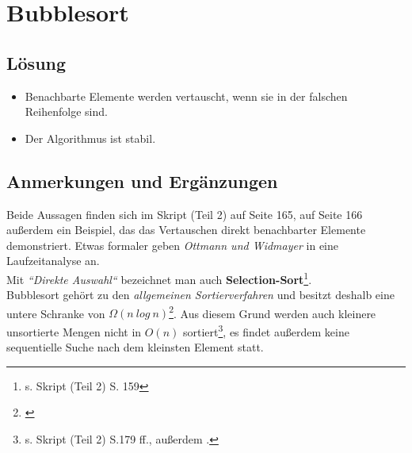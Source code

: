 \chapter{Bubblesort}

\section*{Lösung}

\begin{itemize}
    \item Benachbarte Elemente werden vertauscht, wenn sie in der falschen Reihenfolge sind.
    \item Der Algorithmus ist stabil.
\end{itemize}



\section*{Anmerkungen und Ergänzungen}

Beide Aussagen finden sich im Skript (Teil 2) auf Seite 165, auf Seite 166 außerdem ein Beispiel, das das Vertauschen direkt benachbarter Elemente demonstriert.
Etwas formaler geben \textit{Ottmann und Widmayer} in \cite[89 ff.]{OW17b} eine Laufzeitanalyse an.
\\

Mit \textit{``Direkte Auswahl``} bezeichnet man auch \textbf{Selection-Sort}\footnote{ s. Skript (Teil 2) S. 159}.
\\

Bubblesort gehört zu den \textit{allgemeinen Sortierverfahren} und besitzt deshalb eine untere Schranke von $\Omega(n\ log\ n)$\footnote{\cite[154]{OW17b}}.
Aus diesem Grund werden auch kleinere unsortierte Mengen nicht in $O(n)$ sortiert\footnote{
s. Skript (Teil 2) S.179 ff., außerdem \cite[153 ff.]{OW17b}.
}, es findet außerdem keine sequentielle Suche nach dem kleinsten Element statt.

